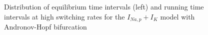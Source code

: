 \documentclass[12pt,a4paper]{article}
\begin{document}
\begin{figure}[H]
	\hspace*{-0.5cm}
	\caption{Distribution of equilibrium time intervals (left) and running time intervals at high switching rates for the $I_{Na,p}+I_K$ model with Andronov-Hopf bifurcation}
	\label{intdistanhopf}
\end{figure}
\end{document}
